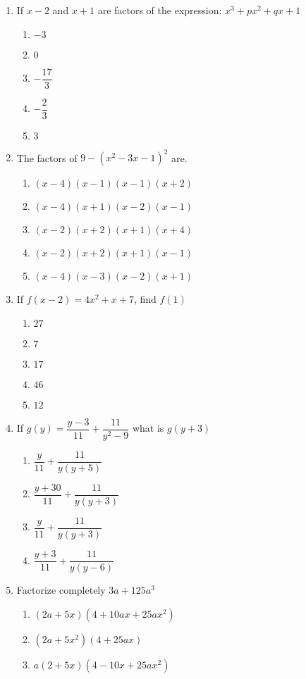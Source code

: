 \begin{multicols}{2}
\begin{enumerate}[label={\arabic*.}]
\item If \(x-2\) and \(x+1\) are factors of the expression: \({x}^{3}+p{x}^{2}+qx+1\)
	\begin{enumerate}[label={\Alph*.}]
	\item \(-3\)
	\item \(0\)
	\item \(-\dfrac{17}{3}\)
	\item \(-\dfrac{2}{3}\)
	\item \(3\)
	\end{enumerate}
\item The factors of \(9-({x}^{2}-3x-1)^2\) are. 
	\begin{enumerate}[label={\Alph*.}]
	\item \((x-4)(x-1)(x-1)(x+2)\)
	\item \((x-4)(x+1)(x-2)(x-1)\)
	\item \((x-2)(x+2)(x+1)(x+4)\)
	\item \((x-2)(x+2)(x+1)(x-1)\)
	\item \((x-4)(x-3)(x-2)(x+1)\)
	\end{enumerate}
\item If \(f(x-2) = 4{x}^{2} + x + 7 \), find \(f(1)\)
	\begin{enumerate}[label={\Alph*.}]
	\item \(27\)
	\item \(7\)
	\item \(17\)
	\item \(46\)
	\item \(12\)
	\end{enumerate}
\item If \(g(y) = \dfrac{y - 3}{11} + \dfrac{11}{y^2-9}\) what is \(g(y+3)\)
	\begin{enumerate}[label={\Alph*.}]
	\item \(\dfrac{y}{11} + \dfrac{11}{y(y+5)}\)
	\item \(\dfrac{y+30}{11} + \dfrac{11}{y(y+3)}\)
	\item \(\dfrac{y}{11} + \dfrac{11}{y(y+3)}\)
	\item \(\dfrac{y+3}{11}+\dfrac{11}{y(y-6)}\)
	\end{enumerate}
\item Factorize completely \(3a+125a^3\)
	\begin{enumerate}[label={\Alph*.}]
	\item \((2a+5x)(4+10ax + 25a{x}^{2})\)
	\item \((2a+5{x}^{2})(4+25ax)\)
	\item \(a(2+5x)(4-10x+25a{x}^{2})\)

\end{enumerate}
\end{enumerate}
\end{multicols}
